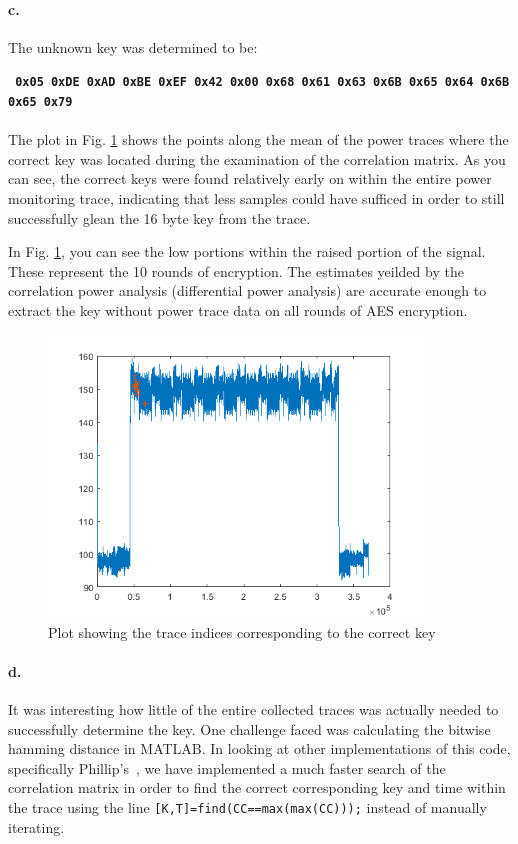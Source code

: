 \documentclass[letterpaper]{article}
\begin{document}
\newpage
\paragraph{c.}

The unknown key was determined to be:

\vspace{1cm}
\textbf{\texttt{
0x05 
0xDE 
0xAD 
0xBE 
0xEF
0x42
0x00
0x68
0x61
0x63
0x6B
0x65
0x64
0x6B
0x65
0x79}}\\
\vspace{1cm}\\
The plot in Fig. \ref{fig:traceIndex} shows the points along the mean of the power traces where the correct key was located during the examination of the correlation matrix. As you can see, the correct keys were found relatively early on within the entire power monitoring trace, indicating that less samples could have sufficed in order to still successfully glean the 16 byte key from the trace.

In Fig. \ref{fig:traceIndex}, you can see the low portions within the raised portion of the signal. These represent the 10 rounds of encryption. The estimates yeilded by the correlation power analysis (differential power analysis) are accurate enough to extract the key without power trace data on all rounds of AES encryption.

\begin{figure}[h!]
\centering
\includegraphics[width=10cm]{keyIndexPlot.png}
\caption{Plot showing the trace indices corresponding to the correct key}
\label{fig:traceIndex}
\end{figure}

\paragraph{d.}
It was interesting how little of the entire collected traces was actually needed to successfully determine the key. One challenge faced was calculating the bitwise hamming distance in MATLAB. In looking at other implementations of this code, specifically Phillip's~\cite{gaphil}, we have implemented a much faster search of the correlation matrix in order to find the correct corresponding key and time within the trace using the line \texttt{[K,T]=find(CC==max(max(CC)));} instead of manually iterating.




\end{document}
